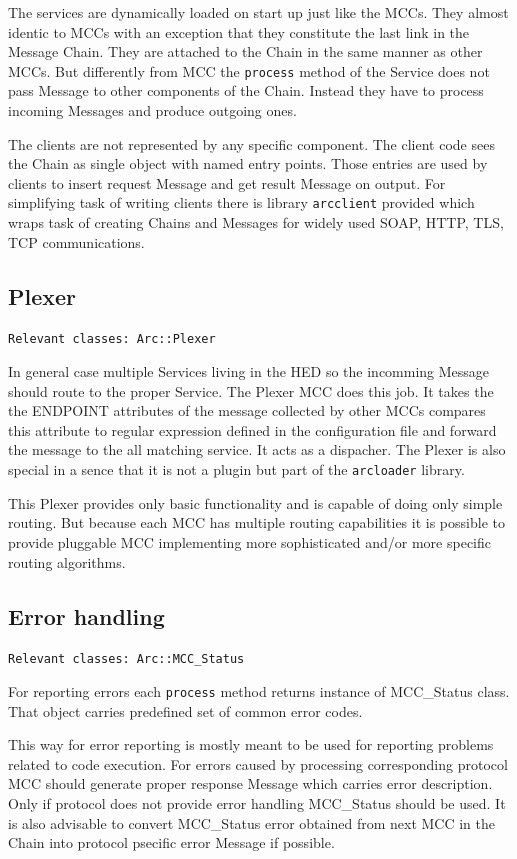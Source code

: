 \documentclass{book}
\begin{document}
The services are dynamically loaded on start up just like the MCCs. They almost identic to MCCs with an exception that they constitute the last link in the Message Chain. They are attached to the Chain in the same manner as other MCCs. But differently from MCC the \texttt{process} method of the Service does not pass Message to other components of the Chain. Instead they have to process incoming Messages and produce outgoing ones.

The clients are not represented by any specific component. The client code sees the Chain as single object with named entry points. Those entries are used by clients to insert request Message and get result Message on output. For simplifying task of writing clients there is library \texttt{arcclient} provided which wraps task of creating Chains and Messages for widely used SOAP, HTTP, TLS, TCP communications.


\subsection{Plexer}

\texttt{Relevant classes: Arc::Plexer }

In general case multiple Services living in the HED so the incomming Message should route to the proper Service. The Plexer MCC does this job. It takes the the ENDPOINT attributes of the message collected by other MCCs compares this attribute to regular expression defined in the configuration file and forward the message to the all matching service. It acts as a dispacher. The Plexer is also special in a sence that it is not a plugin but part of the \texttt{arcloader} library. 

This Plexer provides only basic functionality and is capable of doing only simple routing. But because each MCC has multiple routing capabilities it is possible to provide pluggable MCC implementing more sophisticated and/or more specific routing algorithms.


\subsection{Error handling}

\texttt{Relevant classes: Arc::MCC\_Status}

For reporting errors each \texttt{process} method returns instance of MCC\_Status class. That object carries predefined set of common error codes.

This way for error reporting is mostly meant to be used for reporting problems related to code execution. For errors caused by processing corresponding protocol MCC should generate proper response Message which carries error description. Only if protocol does not provide error handling MCC\_Status should be used. It is also advisable to convert MCC\_Status error obtained from next MCC in the Chain into protocol psecific error Message if possible.
\end{document}

